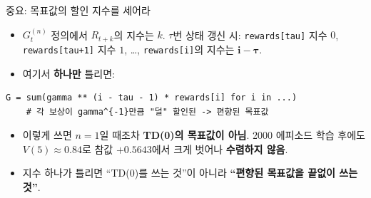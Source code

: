 \begin{frame}[fragile]{중요: 목표값의 할인 지수를 세어라}
  \begin{itemize}
    \item $G_t^{(n)}$ 정의에서 $R_{t+k}$의 지수는 $k$. $\tau$번 상태
      갱신 시: \texttt{rewards[tau]} 지수 $0$, \texttt{rewards[tau+1]}
      지수 $1$, …, \texttt{rewards[i]}의 지수는 $\mathbf{i - \tau}$.
    \item 여기서 \textbf{하나만} 틀리면:
  \end{itemize}
  \begin{lstlisting}[basicstyle=\ttfamily\footnotesize]
    G = sum(gamma ** (i - tau - 1) * rewards[i] for i in ...)
    # 각 보상이 gamma^{-1}만큼 "덜" 할인된 -> 편향된 목표값
  \end{lstlisting}
  \begin{itemize}
    \item 이렇게 쓰면 $n=1$일 때조차 \textbf{TD(0)의 목표값이 아님}.
      2000 에피소드 학습 후에도 $V(5) \approx 0.84$로 참값
      $+0.5643$에서 크게 벗어나 \textbf{수렴하지 않음}.
    \item 지수 하나가 틀리면 ``TD(0)를 쓰는 것''이 아니라
      \textbf{``편향된 목표값을 끝없이 쓰는 것''}.
  \end{itemize}
\end{frame}
